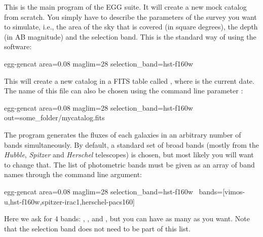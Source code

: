 \documentclass[12pt,a4paper]{article}
\newcommand{\egg}{\textsc{EGG}\xspace}
\newcommand{\herschel}{{\it Herschel}\xspace}
\newcommand{\spitzer}{{\it Spitzer}\xspace}
\newcommand{\hubble}{{\it Hubble}\xspace}
\begin{document}
This is the main program of the \egg suite. It will create a new mock catalog from scratch. You simply have to describe the parameters of the survey you want to simulate, i.e., the area of the sky that is covered (in square degrees), the depth (in AB magnitude) and the selection band. This is the standard way of using the software:
\begin{bashcode}
egg-gencat area=0.08 maglim=28 selection_band=hst-f160w
\end{bashcode}
This will create a new catalog in a FITS table called , where \bashinline{[yyyymmdd]} is the current date. The name of this file can also be chosen using the command line parameter :
\begin{bashcode}
egg-gencat area=0.08 maglim=28 selection_band=hst-f160w out=some_folder/mycatalog.fits
\end{bashcode}

The program generates the fluxes of each galaxies in an arbitrary number of bands simultaneously. By default, a standard set of broad bands (mostly from the \hubble, \spitzer and \herschel telescopes) is chosen, but most likely you will want to change that. The list of photometric bands must be given as an array of band names through the  command line argument:
\begin{bashcode}
egg-gencat area=0.08 maglim=28 selection_band=hst-f160w \
    bands=[vimos-u,hst-f160w,spitzer-irac1,herschel-pacs160]
\end{bashcode}
Here we ask for $4$ bands: , ,  and , but you can have as many as you want. Note that the selection band does not need to be part of this list.
\end{document}
